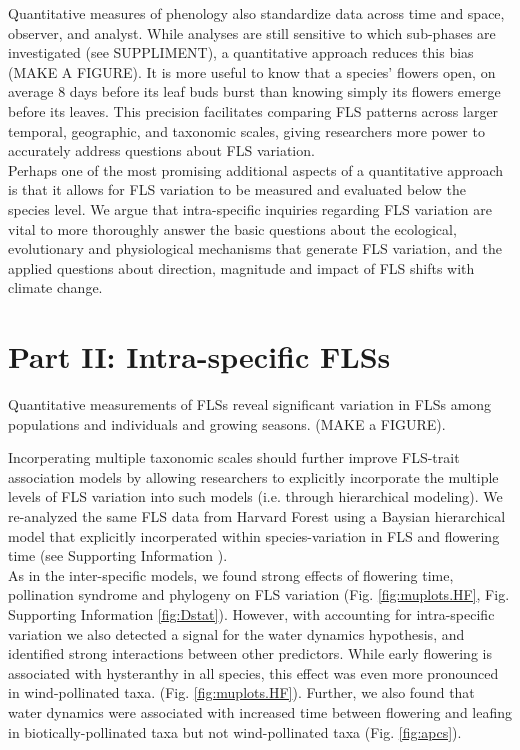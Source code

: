 \documentclass[11pt]{article}
\begin{document}
{\noindent Quantitative measures of phenology \citep[e.g. the BBCH scale,][]{Finn2007} also standardize data across time and space, observer, and analyst. While analyses are still sensitive to which sub-phases are investigated (see SUPPLIMENT), a quantitative approach reduces this bias (MAKE A FIGURE). It is more useful to know that a species' flowers open, on average 8 days before its leaf buds burst than knowing simply its flowers emerge before its leaves. This precision facilitates comparing FLS patterns across larger temporal, geographic, and taxonomic scales, giving researchers more power to accurately address questions about FLS variation.\\

\noindent Perhaps one of the most promising additional aspects of a quantitative approach is that it allows for FLS variation to be measured and evaluated below the species level. We argue that intra-specific inquiries regarding FLS variation are vital to more thoroughly answer the basic questions about the ecological, evolutionary and physiological mechanisms that generate FLS variation, and the applied questions about direction, magnitude and impact of FLS shifts with climate change.

\section*{Part II: Intra-specific FLSs}
Quantitative measurements of FLSs reveal significant variation in FLSs among populations and individuals and growing seasons. (MAKE a FIGURE).

\noindent Incorperating multiple taxonomic scales should further improve FLS-trait association models by allowing researchers to explicitly incorporate the multiple levels of FLS variation into such models (i.e. through hierarchical modeling). We re-analyzed the same FLS data from Harvard Forest using a Baysian hierarchical model that explicitly incorperated within species-variation in FLS and flowering time (see Supporting Information ).\\

\noindent As in the inter-specific models, we found strong effects of flowering time, pollination syndrome and phylogeny on FLS variation (Fig. \ref{fig:muplots.HF}, Fig. Supporting Information \ref{fig:Dstat}). However, with accounting for intra-specific variation we also detected a signal for the water dynamics hypothesis, and identified strong interactions between other predictors. While early flowering is associated with hysteranthy in all species, this effect was even more pronounced in wind-pollinated taxa. (Fig. \ref{fig:muplots.HF}). Further, we also found that water dynamics were associated with increased time between flowering and leafing in biotically-pollinated taxa but not wind-pollinated taxa (Fig. \ref{fig:apcs}). \\

}
\end{document}
